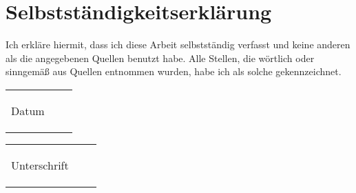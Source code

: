 \section*{Selbstständigkeitserklärung}
Ich erkläre hiermit, dass ich diese Arbeit selbstständig verfasst und keine anderen als die angegebenen  Quellen  benutzt  habe.  Alle  Stellen, die wörtlich oder sinngemäß aus Quellen entnommen wurden, habe ich als solche gekennzeichnet.

\vspace{5 cm}
\begin{tabular}{p{6.5cm}p{.5cm}l}
	\dotfill
	\begin{center}
		Datum
	\end{center}
\end{tabular}
\hfill
\begin{tabular}{p{6.5cm}p{.5cm}l}
	\dotfill
	\begin{center}
		Unterschrift
	\end{center}
\end{tabular}

\newpage
